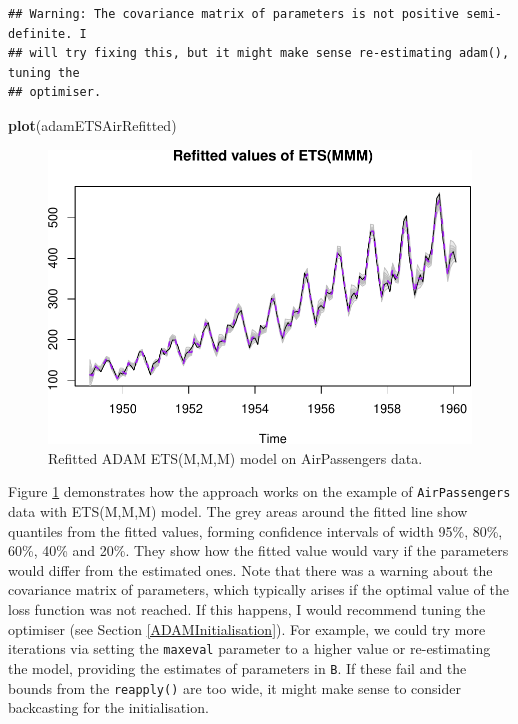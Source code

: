 \documentclass[]{book}
\newenvironment{Shaded}{\begin{snugshade}}{\end{snugshade}}
\newcommand{\KeywordTok}[1]{\textcolor[rgb]{0.13,0.29,0.53}{\textbf{#1}}}
\newcommand{\NormalTok}[1]{#1}
\theoremstyle{definition}
\theoremstyle{definition}
\theoremstyle{definition}
\theoremstyle{definition}
\theoremstyle{remark}
\begin{document}
\begin{verbatim}
## Warning: The covariance matrix of parameters is not positive semi-definite. I
## will try fixing this, but it might make sense re-estimating adam(), tuning the
## optimiser.
\end{verbatim}

\begin{Shaded}
\begin{Highlighting}[]
\KeywordTok{plot}\NormalTok{(adamETSAirRefitted)}
\end{Highlighting}
\end{Shaded}

\begin{figure}
\centering
\includegraphics{Svetunkov--2022----ADAM_files/figure-latex/adamETSRefitted-1.pdf}
\caption{\label{fig:adamETSRefitted}Refitted ADAM ETS(M,M,M) model on AirPassengers data.}
\end{figure}

Figure \ref{fig:adamETSRefitted} demonstrates how the approach works on the example of \texttt{AirPassengers} data with ETS(M,M,M) model. The grey areas around the fitted line show quantiles from the fitted values, forming confidence intervals of width 95\%, 80\%, 60\%, 40\% and 20\%. They show how the fitted value would vary if the parameters would differ from the estimated ones. Note that there was a warning about the covariance matrix of parameters, which typically arises if the optimal value of the loss function was not reached. If this happens, I would recommend tuning the optimiser (see Section \ref{ADAMInitialisation}). For example, we could try more iterations via setting the \texttt{maxeval} parameter to a higher value or re-estimating the model, providing the estimates of parameters in \texttt{B}. If these fail and the bounds from the \texttt{reapply()} are too wide, it might make sense to consider backcasting for the initialisation.
\end{document}
